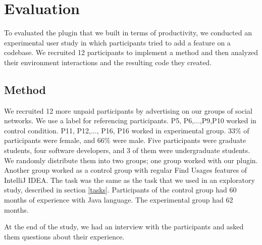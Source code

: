 \documentclass[conference]{IEEEtran}
\begin{document}








\section{Evaluation}
To evaluated the plugin that we built in terms of productivity, we conducted an experimental user study in which participants tried to add a feature on a codebase. We recruited 12 participants to implement a method and then analyzed their environment interactions and the resulting code they created. 

\subsection{Method}

We recruited 12 more unpaid participants by advertising on our groups of social networks. We use a label for referencing participants. P5, P6,...,P9,P10 worked in control condition. P11, P12,..., P16, P16 worked in experimental group. 33\% of participants were female, and 66\% were male. Five participants were graduate students, four software developers, and 3 of them were undergraduate students. We randomly distribute them into two groups; one group worked with our plugin. Another group worked as a control group with regular Find Usages features of IntelliJ IDEA. The task was the same as the task that we used in an exploratory study, described in section \ref{tasks}. Participants of the control group had 60 months of experience with Java language. The experimental group had 62 months.\par 
At the end of the study, we had an interview with the participants and asked them questions about their experience.
\end{document}
